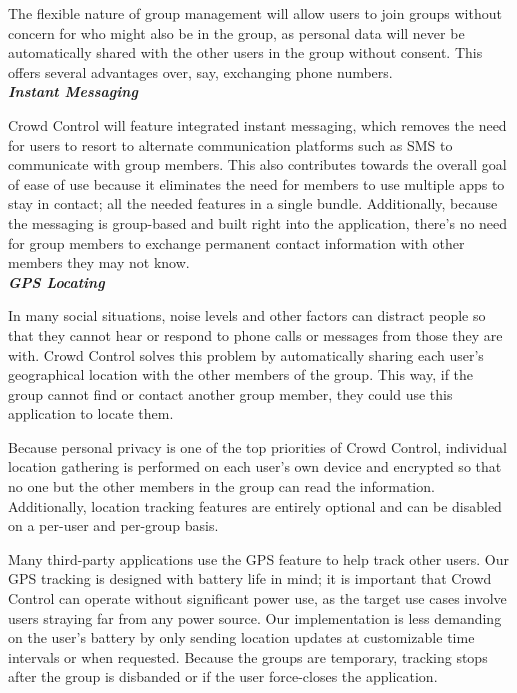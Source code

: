 The flexible nature of group management will allow users to join groups without concern for who
might also be in the group, as personal data will never be automatically shared with the other users
in the group without consent. This offers several advantages over, say, exchanging phone numbers.\\

\noindent
\textit{\textbf{Instant Messaging}}

Crowd Control will feature integrated instant messaging, which removes the need for users to resort to
alternate communication platforms such as SMS to communicate with group members. This also
contributes towards the overall goal of ease of use because it eliminates the need for members to
use multiple apps to stay in contact; all the needed features in a single bundle. Additionally, because
the messaging is group-based and built right into the application, there's no need for group members
to exchange permanent contact information with other members they may not know.\\

\noindent
\textit{\textbf{GPS Locating}}

In many social situations, noise levels and other factors can distract people so that they cannot hear
or respond to phone calls or messages from those they are with. Crowd Control solves this problem by
automatically sharing each user's geographical location with the other members of the group. This way,
if the group cannot find or contact another group member, they could use this application to locate
them.

Because personal privacy is one of the top priorities of Crowd Control, individual location gathering is
performed on each user's own device and encrypted so that no one but the other members in the group
can read the information. Additionally, location tracking features are entirely optional and can be
disabled on a per-user and per-group basis.

Many third-party applications use the GPS feature to help track other users. Our GPS tracking is
designed with battery life in mind; it is important that Crowd Control can operate without significant
power use, as the target use cases involve users straying far from any power source. Our implementation
is less demanding on the user's battery by only sending location updates at customizable time intervals
or when requested. Because the groups are temporary, tracking stops after the group is disbanded or if
the user force-closes the application.
